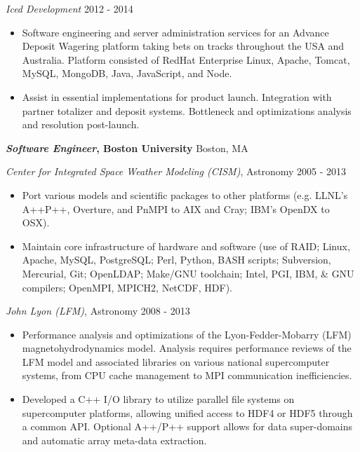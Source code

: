 \documentclass[line,margin]{res}
\begin{document}
\begin{resume}
          {\sl Iced Development} \hfill 2012 - 2014
          \begin{itemize} \itemsep -2pt
          \item
            Software engineering and server administration services for an Advance Deposit Wagering platform taking bets on tracks throughout the USA and Australia. Platform consisted of RedHat Enterprise Linux, Apache, Tomcat, MySQL, MongoDB, Java, JavaScript, and Node.
          \item
            Assist in essential implementations for product launch. Integration with partner totalizer and deposit systems. Bottleneck and optimizations analysis and resolution post-launch.
          \end{itemize}

          {\bf \emph{Software Engineer}, Boston University} \hfill Boston, MA

          {\sl Center for Integrated Space Weather Modeling (CISM)}, Astronomy \hfill 2005 - 2013
          \begin{itemize} \itemsep -2pt %
          \item
            Port various models and scientific packages to other platforms (e.g. LLNL's A++P++, Overture, and PnMPI to AIX and Cray; IBM's OpenDX to OSX).
          \item
            Maintain core infrastructure of hardware and software (use of RAID; Linux, Apache, MySQL, PostgreSQL; Perl, Python, BASH scripts; Subversion, Mercurial, Git; OpenLDAP; Make/GNU toolchain; Intel, PGI, IBM, \& GNU compilers; OpenMPI, MPICH2, NetCDF, HDF).
          \end{itemize}

          {\sl John Lyon (LFM)}, Astronomy \hfill 2008 - 2013
          \begin{itemize} \itemsep -2pt %
          \item
            Performance analysis and optimizations of the Lyon-Fedder-Mobarry (LFM) magnetohydrodynamics model.  Analysis requires performance reviews of the LFM model and associated libraries on various national supercomputer systems, from CPU cache management to MPI communication inefficiencies.
          \item
            Developed a C++ I/O library to utilize parallel file systems on supercomputer platforms, allowing unified access to HDF4 or HDF5 through a common API. Optional A++/P++ support allows for data super-domains and automatic array meta-data extraction.
          \end{itemize}


\end{resume}
\end{document}
